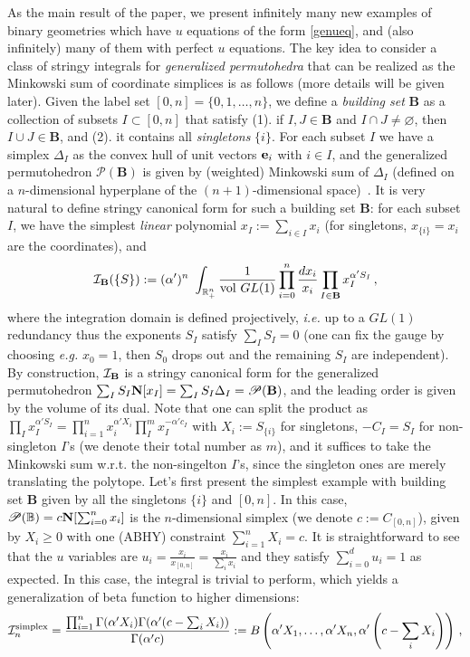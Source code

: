 \documentclass[hidelinks,12pt]{article}
\begin{document}
As the main result of the paper, we present infinitely many new examples of binary geometries which have $u$ equations of the form \eqref{genueq}, and (also infinitely) many of them with perfect $u$ equations. The key idea to consider a class of stringy integrals for {\it generalized permutohedra} that can be realized as the Minkowski sum of coordinate simplices is as follows (more details will be given later). Given the label set $[0,n]=\{0,1,\dots, n\}$, we define a {\it building set} $\mathbf B$ as a collection of subsets $I \subset [0,n]$ that satisfy (1). if $I, J \in {\mathbf B}$ and $I\cap J\neq \varnothing$, then $I\cup J \in {\mathbf B}$, and (2). it contains all {\it singletons} $\{i\}$. For each subset $I$ we have a simplex $\Delta_I$ as the convex hull of unit vectors ${\bf e}_i$ with $i\in I$, and the generalized permutohedron ${\mathscr P}(\mathbf B)$ is given by (weighted) Minkowski sum of $\Delta_I$ (defined on a $n$-dimensional hyperplane of the $(n{+}1)$-dimensional space)~\cite{Postnikov:2005}.  It is very natural to define stringy canonical form for such a building set $\mathbf B$: for each subset $I$, we have the simplest {\it linear} polynomial $x_I:=\sum_{i\in I} x_i$ (for singletons, $x_{\{i\}}=x_i$ are the coordinates), and
\begin{equation}\label{intgenperm}
{\cal I}_{\mathbf B}(\{S\}):=(\alpha')^n~\int_{\mathbb R_+^n}\frac{1}{{\rm vol}~GL(1)} \prod_{i=0}^n \frac{d x_i}{x_i} %
\prod_{I \in {\mathbf B}} x_I^{\alpha' S_I}\,,
\end{equation}
where the integration domain is defined projectively, {\it i.e.} up to a $GL(1)$ redundancy thus the exponents $S_I$ satisfy $\sum_I S_I=0$ (one can fix the gauge by choosing {\it e.g.} $x_0=1$, then $S_0$ drops out and the remaining $S_I$ are independent). By construction, ${\cal I}_{\mathbf B}$ is a stringy canonical form for the generalized permutohedron $\sum_I S_I {\bf N} [x_I]=\sum_I S_I \Delta_I={\mathscr P}(\mathbf B)$, and the leading order is given by the volume of its dual. Note that one can split the product as $\prod_I x_I^{\alpha' S_I}=\prod_{i=1}^n x_i^{\alpha' X_i} \prod_I^m x_I^{-\alpha' c_I}$ with $X_i:=S_{\{i\}}$ for singletons, $-C_I=S_I$ for non-singleton $I$'s (we denote their total number as $m$), and it suffices to take the Minkowski sum w.r.t. the non-singelton $I$'s, since the singleton ones are merely translating the polytope. Let's first present the simplest example with building set ${\mathbf B}$ given by all the singletons $\{i\}$ and $[0,n]$. In this case, ${\mathscr P}(\mathbb B)=c {\bf N} [\sum_{i=0}^n x_i]$ is the $n$-dimensional simplex (we denote $c:=C_{[0, n]}$), given by $X_i \geq 0$ with one (ABHY) constraint $\sum_{i=1}^n X_i=c$. It is straightforward to see that the $u$ variables are $u_i=\frac{x_i}{x_{[0,n]}}=\frac{x_i}{\sum_i x_i}$ and they satisfy $\sum_{i=0}^d u_i=1$ as expected. In this case, the integral is trivial to perform, which yields a generalization of beta function to higher dimensions:
\[
{\cal I}^{\rm simplex}_n=\frac{\prod_{i=1}^n \Gamma(\alpha' X_i)\Gamma(\alpha'(c- \sum_i X_i))}{\Gamma(\alpha'c)}:=B\left(\alpha' X_1, \dots, \alpha' X_n,\alpha'\left(c- \sum_i X_i\right)\right)\,,
\]
\end{document}
